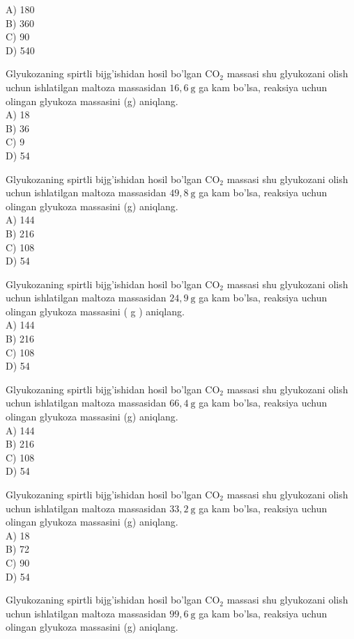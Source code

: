 A) 180\\
B) 360\\
C) 90\\
D) 540
  \item Glyukozaning spirtli bijg'ishidan hosil bo'lgan $\mathrm{CO}_{2}$ massasi shu glyukozani olish uchun ishlatilgan maltoza massasidan $16,6 \mathrm{~g}$ ga kam bo'lsa, reaksiya uchun olingan glyukoza massasini (g) aniqlang.\\
A) 18\\
B) 36\\
C) 9\\
D) 54
  \item Glyukozaning spirtli bijg'ishidan hosil bo'lgan $\mathrm{CO}_{2}$ massasi shu glyukozani olish uchun ishlatilgan maltoza massasidan $49,8 \mathrm{~g}$ ga kam bo'lsa, reaksiya uchun olingan glyukoza massasini (g) aniqlang.\\
A) 144\\
B) 216\\
C) 108\\
D) 54
  \item Glyukozaning spirtli bijg'ishidan hosil bo'lgan $\mathrm{CO}_{2}$ massasi shu glyukozani olish uchun ishlatilgan maltoza massasidan $24,9 \mathrm{~g}$ ga kam bo'lsa, reaksiya uchun olingan glyukoza massasini ( g ) aniqlang.\\
A) 144\\
B) 216\\
C) 108\\
D) 54
  \item Glyukozaning spirtli bijg'ishidan hosil bo'lgan $\mathrm{CO}_{2}$ massasi shu glyukozani olish uchun ishlatilgan maltoza massasidan $66,4 \mathrm{~g}$ ga kam bo'lsa, reaksiya uchun olingan glyukoza massasini (g) aniqlang.\\
A) 144\\
B) 216\\
C) 108\\
D) 54
  \item Glyukozaning spirtli bijg'ishidan hosil bo'lgan $\mathrm{CO}_{2}$ massasi shu glyukozani olish uchun ishlatilgan maltoza massasidan $33,2 \mathrm{~g}$ ga kam bo'lsa, reaksiya uchun olingan glyukoza massasini (g) aniqlang.\\
A) 18\\
B) 72\\
C) 90\\
D) 54
  \item Glyukozaning spirtli bijg'ishidan hosil bo'lgan $\mathrm{CO}_{2}$ massasi shu glyukozani olish uchun ishlatilgan maltoza massasidan $99,6 \mathrm{~g}$ ga kam bo'lsa, reaksiya uchun olingan glyukoza massasini (g) aniqlang.\\
